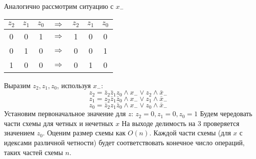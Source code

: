 \documentclass{article}
\begin{document}
Аналогично рассмотрим ситуацию с $x_-$
\begin{center}
\begin{tabular}{|c|c|c|c|c|c|c|}
\hline
$z_2$ & $z_1$ & $z_0$ & $\Rightarrow$ & $z_2$ & $z_1$ & $z_0$   \\
\hline
0 & 0 & 1 & $\Rightarrow$  & 1 & 0 & 0 \\
\hline
0 & 1 & 0 & $\Rightarrow$  & 0 & 0 & 1 \\
\hline
1 & 0 & 0 & $\Rightarrow$  & 0 & 1 & 0 \\
\hline
\end{tabular}
\end{center}
Выразим $z_2, z_1, z_0$, используя $x_-$:
$$z_2 = \bar{z}_2 \bar{z}_1 z_0 \wedge x_- \vee z_2 \wedge \bar{x}_- $$
$$z_1 = z_2 \bar{z}_1 \bar{z}_0 \wedge x_- \vee z_1 \wedge \bar{x}_- $$
$$z_0 = \bar{z}_2 z_1 \bar{z}_0 \wedge x_- \vee z_0 \wedge \bar{x}_- $$
Установим первоначальное значение для $z$: $z_2=0, z_1=0, z_0=1$
Будем чередовать части схемы для четных и нечетных $x$ 
На выходе делимость на 3 проверяется значением $z_0$.
Оценим размер схемы как $O(n)$. Каждой части схемы (для $x$ с идексами различной четности) будет соответствовать конечное число операций, таких частей схемы $n$.  
\newline
\newline
\end{document}
